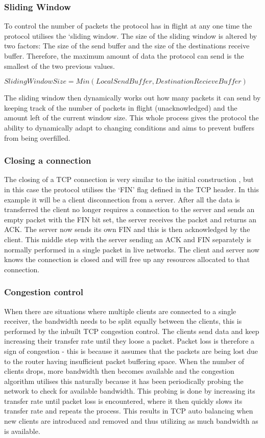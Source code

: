 \subsubsection*{Sliding Window}
\label{ref:window}
To control the number of packets the protocol has in flight at any one time the protocol utilises the `sliding window. The size of the sliding window is altered by two factors: The size of the send buffer and the size of the destinations receive buffer. Therefore, the maximum amount of data the protocol can send is the smallest of the two previous values. 
\begin{center}
	$SlidingWindowSize = Min(LocalSendBuffer, DestinationRecieveBuffer)$
\end{center}
The sliding window then dynamically works out how many packets it can send by keeping track of the number of packets in flight (unacknowledged) and the amount left of the current window size. This whole process gives the protocol the ability to dynamically adapt to changing conditions and aims to prevent buffers from being overfilled.


\subsubsection*{Closing a connection}
The closing of a TCP connection is very similar to the initial construction \citep{TCP}, but in this case the protocol utilises the `FIN' flag defined in the TCP header. In this example it will be a client disconnection from a server. After all the data is transferred the client no longer requires a connection to the server and sends an empty packet with the FIN bit set, the server receives the packet and returns an ACK. The server now sends its own FIN and this is then acknowledged by the client. This middle step with the server sending an ACK and FIN separately is normally performed in a single packet in live networks. The client and server now knows the connection is closed and will free up any resources allocated to that connection.



\subsubsection*{Congestion control}
When there are situations where multiple clients are connected to a single receiver, the bandwidth needs to be split equally between the clients, this is performed by the inbuilt TCP congestion control. The clients send data and keep increasing their transfer rate until they loose a packet. Packet loss is therefore a sign of congestion - this is because it assumes that the packets are being lost due to the router having insufficient packet buffering space. When the number of clients drops, more bandwidth then becomes available and the congestion algorithm utilises this naturally because it has been periodically probing the network to check for available bandwidth. This probing is done by increasing its transfer rate until packet loss is encountered, where it then quickly slows its transfer rate and repeats the process. This results in TCP auto balancing when new clients are introduced and removed and thus utilizing as much bandwidth as is available.

